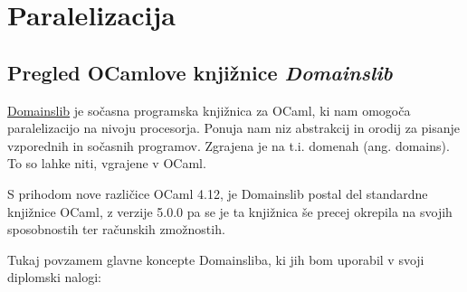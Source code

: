\documentclass[mat1, tisk]{fmfdelo}
\begin{document}
\pagebreak

\section{Paralelizacija}

\subsection{Pregled OCamlove knjižnice \textit{Domainslib}} \label{sec:pregled_domainslib}

\href{https://github.com/ocaml-multicore/domainslib}{Domainslib} je sočasna programska knjižnica za OCaml, 
ki nam omogoča paralelizacijo na nivoju procesorja.
Ponuja nam niz abstrakcij in orodij za pisanje vzporednih in sočasnih programov. 
Zgrajena je na t.i. domenah (ang. domains). To so lahke niti, vgrajene v OCaml.

S prihodom nove različice OCaml 4.12, je Domainslib postal del standardne knjižnice OCaml, z verzije 5.0.0 pa se je ta knjižnica
še precej okrepila na svojih sposobnostih ter računskih zmožnostih.

Tukaj povzamem glavne koncepte Domainsliba, ki jih bom uporabil v svoji diplomski nalogi:
\end{document}

